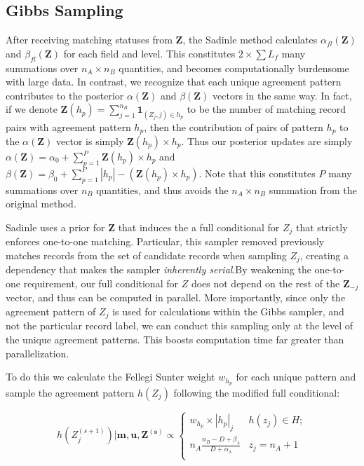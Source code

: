 \documentclass[
  12pt,
]{article}
\begin{document}
\hypertarget{gibbs-sampling}{%
\subsection{Gibbs Sampling}\label{gibbs-sampling}}

After receiving matching statuses from \(\mathbf{Z}\), the Sadinle
method calculates \(\alpha_{fl}(\mathbf{Z})\) and
\(\beta_{fl}(\mathbf{Z})\) for each field and level. This constitutes
\(2 \times \sum L_f\) many summations over \(n_A \times n_B\)
quantities, and becomes computationally burdensome with large data. In
contrast, we recognize that each unique agreement pattern contributes to
the posterior \(\alpha(\mathbf{Z})\) and \(\beta(\mathbf{Z})\) vectors
in the same way. In fact, if we denote
\(\mathbf{Z}(h_p) = \sum_{j=1}^{n_B} \mathbf{1}_{(Z_j, j) \in h_p}\) to
be the number of matching record pairs with agreement pattern \(h_p\),
then the contribution of pairs of pattern \(h_p\) to the
\(\alpha(\mathbf{Z})\) vector is simply \(\mathbf{Z}(h_p) \times h_p\).
Thus our posterior updates are simply
\(\alpha(\mathbf{Z}) = \alpha_0 + \sum_{p=1}^P \mathbf{Z}(h_p) \times h_p\)
and
\(\beta(\mathbf{Z}) = \beta_0 + \sum_{p=1}^P |h_p| - \left(\mathbf{Z}(h_p) \times h_p \right)\).
Note that this constitutes \(P\) many summations over \(n_B\)
quantities, and thus avoids the \(n_A \times n_B\) summation from the
original method.

Sadinle uses a prior for \(\mathbf{Z}\) that induces the a full
conditional for \(Z_j\) that strictly enforces one-to-one matching.
Particular, this sampler removed previously matches records from the set
of candidate records when sampling \(Z_j\), creating a dependency that
makes the sampler \emph{inherently serial}.By weakening the one-to-one
requirement, our full conditional for \(Z\) does not depend on the rest
of the \(\mathbf{Z}_{-j}\) vector, and thus can be computed in parallel.
More importantly, since only the agreement pattern of \(Z_j\) is used
for calculations within the Gibbs sampler, and not the particular record
label, we can conduct this sampling only at the level of the unique
agreement patterns. This boosts computation time far greater than
parallelization.

To do this we calculate the Fellegi Sunter weight \(w_{h_p}\) for each
unique pattern and sample the agreement pattern \(h(Z_j)\) following the
modified full conditional:

\[h\left(Z_j^{(s+1)}\right) | \mathbf{m}, \mathbf{u}, \mathbf{Z^{(s)}} \propto
\begin{cases} 
    w_{h_p}\times |h_p|_j  & h(z_j) \in H; \\
     n_A \frac{n_B - D + \beta_{\lambda}}{D + \alpha_{\lambda}} &  z_j  = n_A + 1 \\
\end{cases}\]
\end{document}
